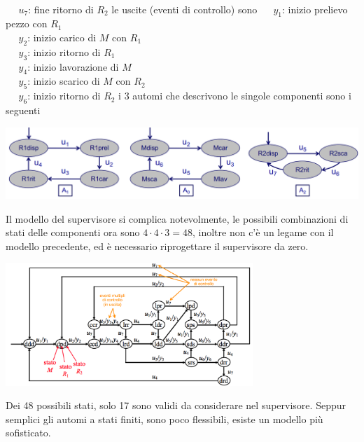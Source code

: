 \documentclass[10pt, letterpaper]{report}
\begin{document}
    \\ $\ \ \ \ \ \ u_7$: fine ritorno di $R_2$
    \acc le uscite (eventi di controllo) sono
    \acc
     $\ \ \ \ \ \ y_1$: inizio prelievo pezzo con $R_1$
    \\ $\ \ \ \ \ \ y_2$: inizio carico di $M$ con $R_1$
    \\ $\ \ \ \ \ \ y_3$: inizio ritorno di $R_1$
    \\ $\ \ \ \ \ \ y_4$: inizio lavorazione di $M$
    \\ $\ \ \ \ \ \ y_5$: inizio scarico di $M$ con $R_2$
    \\ $\ \ \ \ \ \ y_6$: inizio ritorno di $R_2$
    \acc
i 3 automi che descrivono le singole componenti sono i seguenti
\begin{center}
    \includegraphics[width=\textwidth]{images/pressa3.png}
\end{center}
Il modello del supervisore si complica notevolmente, le possibili combinazioni di stati delle componenti ora sono $4\cdot 4 \cdot 3 = 48$, inoltre non c'è un legame con il modello precedente, ed è necessario riprogettare il supervisore da zero.\begin{center}
    \includegraphics[width=0.7\textwidth]{images/pressa4.png}
\end{center}
Dei 48 possibili stati, solo 17 sono validi da considerare nel supervisore. Seppur semplici gli automi a stati finiti, sono poco flessibili, esiste un modello più sofisticato.\flowerLine 
\end{document}

